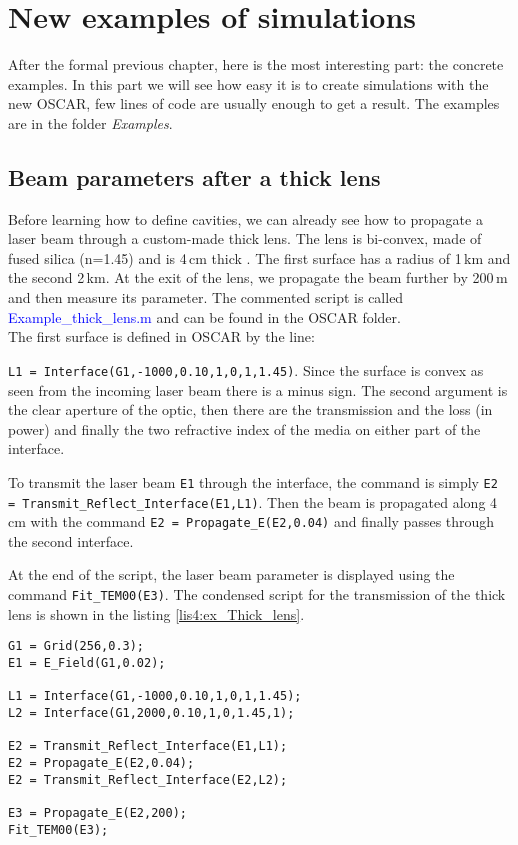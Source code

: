 \chapter{New examples of simulations}\label{ch4:ex}

After the formal previous chapter, here is the most interesting part: the concrete examples. In this part we will see how easy it is to create simulations with the new OSCAR, few lines of code are usually enough to get a result. The examples are in the folder \textsl{Examples}.

\section{Beam parameters after a thick lens}

Before learning how to define cavities, we can already see how to propagate a laser beam through a custom-made thick lens. The lens is bi-convex, made of fused silica (n=1.45) and is 4\,cm thick . The first surface has a radius of 1\,km and the second 2\,km. At the exit of the lens, we propagate the beam further by 200\,m and then measure its parameter. The commented script is called \textcolor{blue}{Example\_thick\_lens.m} and can be found in the OSCAR folder.\\

The first surface is defined in OSCAR by the line:

\noindent \verb|L1 = Interface(G1,-1000,0.10,1,0,1,1.45)|. Since the surface is convex as seen from the incoming laser beam there is a minus sign. The second argument is the clear aperture of the optic, then there are the transmission and the loss (in power) and finally the two refractive index of the media on either part of the interface.

To transmit the laser beam \verb|E1| through the interface, the command is simply \verb|E2 = Transmit_Reflect_Interface(E1,L1)|. Then the beam is propagated along 4\,cm with the command \verb|E2 = Propagate_E(E2,0.04)| and finally passes through the second interface.

At the end of the script, the laser beam parameter is displayed using the command \verb|Fit_TEM00(E3)|. The condensed script for the transmission of the thick lens is shown in the listing \ref{lis4:ex_Thick_lens}.\\

\begin{lstlisting}[float=htp,caption=Example of OSCAR script to simulate a thick lens\label{lis4:ex_Thick_lens},frame=lines]
G1 = Grid(256,0.3);
E1 = E_Field(G1,0.02);

L1 = Interface(G1,-1000,0.10,1,0,1,1.45);
L2 = Interface(G1,2000,0.10,1,0,1.45,1);

E2 = Transmit_Reflect_Interface(E1,L1);
E2 = Propagate_E(E2,0.04);
E2 = Transmit_Reflect_Interface(E2,L2);

E3 = Propagate_E(E2,200);
Fit_TEM00(E3);
\end{lstlisting}


